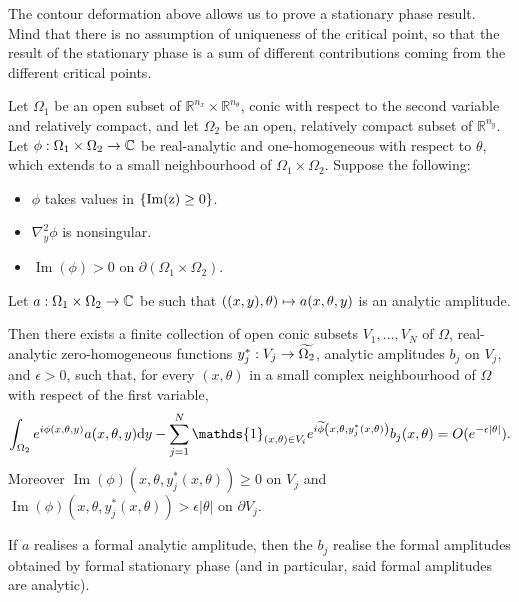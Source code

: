 \documentclass[10pt]{amsart}
\theoremstyle{definition}\newtheorem{defi}[theo]{Definition}\newtheorem{rema}[theo]{Remark}\newtheorem{exam}[theo]{Example}\newtheorem{exem}[theo]{Example}\newtheorem{nota}[theo]{Notation}
\DeclareMathOperator{\im}{Im}
\newcommand\1{\mathds{1}}
\newcommand{\R}{\mathbb{R}}
\newcommand{\C}{\mathbb{C}}
\newcommand{\dd}{\mathrm{d}}
\renewcommand*{\to}{\mathchoice{\longrightarrow}{\rightarrow}{\rightarrow}{\rightarrow}}
\let\oldmapsto\mapsto
\renewcommand*{\mapsto}{\mathchoice{\longmapsto}{\oldmapsto}{\oldmapsto}{\oldmapsto}}
\let\originalleft\left
\let\originalright\right
\renewcommand{\left}{\mathopen{}\mathclose\bgroup\originalleft}
\renewcommand{\right}{\aftergroup\egroup\originalright}
\begin{document}
The contour deformation above allows us to prove a stationary phase result. Mind that there is no assumption of uniqueness of the critical point, so that the result of the stationary phase is a sum of different contributions coming from the different critical points.

\begin{prop}\label{prop:stat_phase}
Let $\Omega_1$ be an open subset of $\R^{n_{x}}\times
\R^{n_{\theta}}$, conic with respect to the second variable and relatively compact, and let $\Omega_2$ be an open, relatively compact subset of $\R^{n_y}$. Let $\phi:\Omega_1\times \Omega_2\to \C$ be real-analytic and one-homogeneous with respect to $\theta$, which extends to a small neighbourhood of $\Omega_1\times \Omega_2$. Suppose the following:
\begin{itemize}
\item $\phi$ takes values in $\{{\rm Im(z)}\geq 0\}$.
\item $\nabla^2_y\phi$ is nonsingular.
\item $\im(\phi)>0$ on $\partial(\Omega_1\times \Omega_2)$.
\end{itemize}

Let $a:\Omega_1\times \Omega_2\to \C$ be such that $((x,y),\theta)\mapsto a(x,\theta,y)$ is an analytic amplitude.

Then there exists a finite collection of open conic subsets $V_1,\dots,V_N$ of $\Omega$, real-analytic zero-homogeneous functions $y^*_j:V_j\to
\widetilde{\Omega_2}$, analytic amplitudes $b_j$ on $V_j$, and $\epsilon>0$, such that, for every $(x,\theta)$ in a small complex neighbourhood of $\Omega$ with respect of the first variable,
\[
\int_{\Omega_2}e^{i\phi(x,\theta,y)}a(x,\theta,y)\dd y -
\sum_{j=1}^N\1_{(x,\theta)\in V_i}e^{i\widetilde{\phi}\left(x,\theta,y^*_j(x,\theta)\right)}b_j(x,\theta)=O(e^{-\epsilon|\theta|}).
\]
Moreover $\im(\phi)(x,\theta,y^*_j(x,\theta))\geq 0$ on $V_j$ and $\im(\phi)(x,\theta,y^*_j(x,\theta))>\epsilon|\theta|$ on $\partial V_j$.


If $a$ realises a formal analytic amplitude, then the $b_j$ realise the formal amplitudes obtained by formal stationary phase (and in particular, said formal amplitudes are analytic).
\end{prop}
\end{document}
